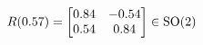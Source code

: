 \documentclass[preview]{standalone}
\begin{document}
\begin{align*}
\special{dvisvgm:raw <g id='unique000'>}R(0.57) = \begin{bmatrix} 0.84 & -0.54 \\ 0.54 & 0.84 \end{bmatrix} \in \text{SO}(2)\special{dvisvgm:raw </g>}
\end{align*}
\end{document}
